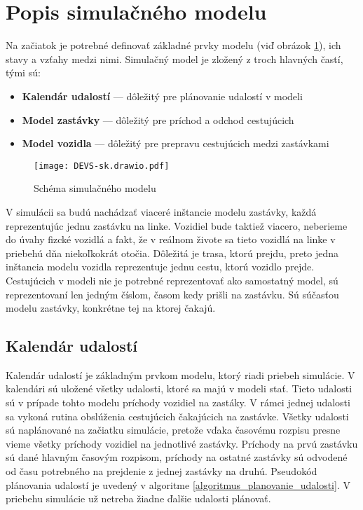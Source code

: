 \section{Popis simulačného modelu}
Na začiatok je potrebné definovať základné prvky modelu (viď obrázok \ref{fig:simulacny_model}), ich stavy a vzťahy medzi nimi.
Simulačný model je zložený z troch hlavných častí, tými sú:
\begin{itemize}
  \item \textbf{Kalendár udalostí} --- dôležitý pre plánovanie udalostí v modeli

  \item \textbf{Model zastávky} --- dôležitý pre príchod a odchod cestujúcich
  \item \textbf{Model vozidla} --- dôležitý pre prepravu cestujúcich medzi zastávkami
\end{itemize}

\begin{figure}[h]
  \label{fig:simulacny_model}
  \centering
  \texttt{[image: DEVS-sk.drawio.pdf]}
  \caption{Schéma simulačného modelu}
\end{figure}

V simulácii sa budú nachádzať viaceré inštancie modelu zastávky, každá reprezentujúc jednu zastávku na linke.
Vozidiel bude taktiež viacero, neberieme do úvahy fizcké vozidlá a fakt, že v reálnom živote sa tieto vozidlá na linke v priebehú dňa niekoľkokrát otočia.
Dôležitá je trasa, ktorú prejdu, preto jedna inštancia modelu vozidla reprezentuje jednu cestu, ktorú vozidlo prejde.
Cestujúcich v modeli nie je potrebné reprezentovať ako samostatný model, sú reprezentovaní len jedným číslom, časom kedy prišli na zastávku.
Sú súčasťou modelu zastávky, konkrétne tej na ktorej čakajú.

\subsection*{Kalendár udalostí}

Kalendár udalostí je základným prvkom modelu, ktorý riadi priebeh simulácie.
V kalendári sú uložené všetky udalosti, ktoré sa majú v modeli stať.
Tieto udalosti sú v prípade tohto modelu príchody vozidiel na zastáky.
V rámci jednej udalosti sa vykoná rutina obslúženia cestujúcich čakajúcich na zastávke.
Všetky udalosti sú naplánované na začiatku simulácie, pretože vďaka časovému rozpisu presne vieme všetky príchody vozidiel na jednotlivé zastávky.
Príchody na prvú zastávku sú dané hlavným časovým rozpisom, príchody na ostatné zastávky sú odvodené od času potrebného na prejdenie z jednej zastávky na druhú.
Pseudokód plánovania udalostí je uvedený v algoritme \ref{algoritmus_planovanie_udalosti}.
V priebehu simulácie už netreba žiadne ďalšie udalosti plánovať.

